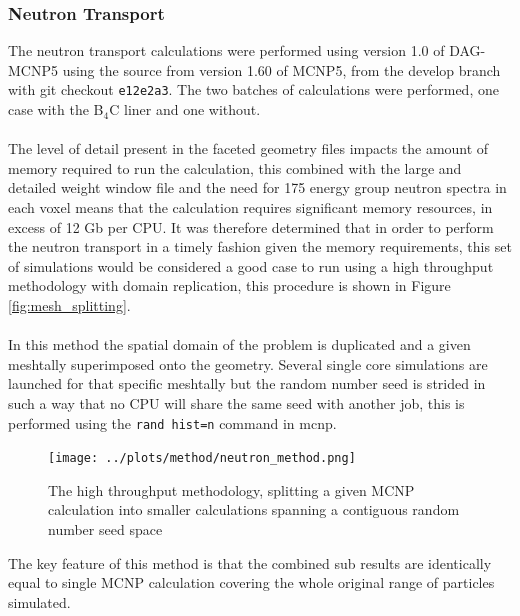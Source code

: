 \documentclass[12pt]{article}
\begin{document}
\subsubsection{Neutron Transport}
The neutron transport calculations were performed using version 1.0 of DAG-MCNP5
using the source from version 1.60 of MCNP5, from the develop branch with git
checkout \texttt{e12e2a3}. The two batches of calculations were performed, one
case with the B$_4$C liner and one without.
\\
\\
The level of detail present in the faceted geometry files impacts the amount of
memory required to run the calculation, this combined with the large and
detailed weight window file and the need for 175 energy group neutron spectra
in each voxel means that the calculation requires significant memory resources,
in excess of 12 Gb per CPU. It was therefore determined that in order to perform
the neutron transport in a timely fashion given the memory requirements, this
set of simulations would be considered a good case to run using a high
throughput methodology with domain replication, this procedure is shown in 
Figure \ref{fig:mesh_splitting}.
\\
\\
In this method the spatial domain of the problem is duplicated and a given
meshtally superimposed onto the geometry. Several single core simulations are
launched for that specific meshtally but the random number seed is strided in
such a way that no CPU will share the same seed with another job, this is
performed using the \texttt{rand hist=n} command in \gls{mcnp}.
\begin{figure}[ht!]
  \centering
  \texttt{[image: ../plots/method/neutron\_method.png]}
  \caption{The high throughput methodology, splitting a given MCNP calculation
           into smaller calculations spanning a contiguous random number seed
           space}
  \label{fig:mesh_spliting}
\end{figure}
The key feature of this method is that the combined sub results are identically
equal to single MCNP calculation covering the whole original range of particles
simulated.
\end{document}
